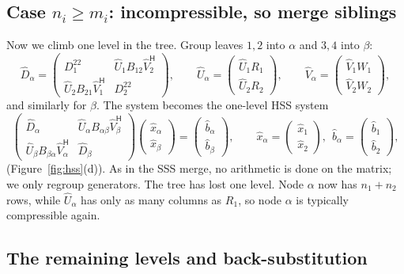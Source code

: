 \documentclass[11pt]{article}
\newcommand{\ct}{^{\mathsf H}}            %
\newcommand{\hU}{\widehat U}
\newcommand{\hV}{\widehat V}
\newcommand{\hD}{\widehat D}
\newcommand{\hx}{\hat x}
\newcommand{\hb}{\hat b}
\theoremstyle{definition}
\begin{document}
\subsection{\texorpdfstring{Case $n_i\geq m_i$: incompressible, so merge siblings}{Case ni >= mi: incompressible, so merge siblings}}

Now we climb one level in the tree. Group leaves $1,2$ into $\alpha$ and
$3,4$ into $\beta$:
\[
\hD_\alpha = \begin{pmatrix} D_1^{22} & \hU_1B_{12}\hV_2\ct\\ \hU_2B_{21}\hV_1\ct & D_2^{22}\end{pmatrix},
\qquad
\hU_\alpha = \begin{pmatrix} \hU_1R_1\\ \hU_2R_2\end{pmatrix},
\qquad
\hV_\alpha = \begin{pmatrix} \hV_1W_1\\ \hV_2W_2\end{pmatrix},
\]
and similarly for $\beta$. The system becomes the one-level HSS system
\[
\left(\begin{array}{c|c}
\hD_\alpha & \hU_\alpha B_{\alpha\beta}\hV_\beta\ct\\[2pt]\hline
\hU_\beta B_{\beta\alpha}\hV_\alpha\ct & \hD_\beta
\end{array}\right)
\left(\begin{array}{c} \hx_\alpha\\[2pt]\hline \hx_\beta\end{array}\right)
=
\left(\begin{array}{c} \hb_\alpha\\[2pt]\hline \hb_\beta\end{array}\right),
\qquad
\hx_\alpha = \begin{pmatrix}\hx_1\\ \hx_2\end{pmatrix},\ \
\hb_\alpha = \begin{pmatrix}\hb_1\\ \hb_2\end{pmatrix},
\]
(Figure~\ref{fig:hss}(d)). As in the SSS merge, no arithmetic is done on the matrix; we only
regroup generators. The tree has lost one level. Node $\alpha$ now has
$n_1+n_2$ rows, while $\hU_\alpha$ has only as many columns as $R_1$, so node
$\alpha$ is typically compressible again.

\subsection{The remaining levels and back-substitution}
\end{document}
